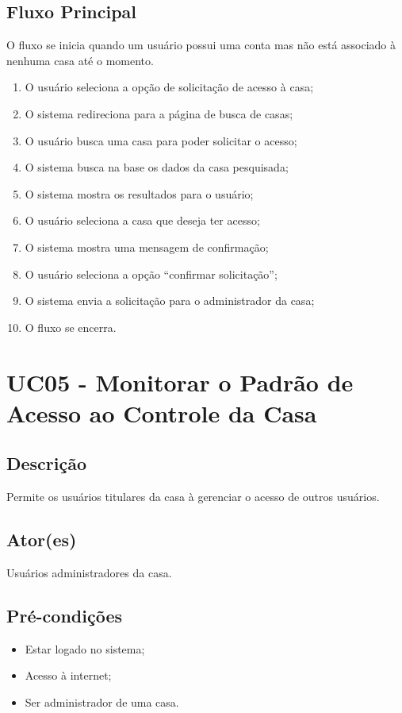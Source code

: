     \subsection{Fluxo Principal}
        O fluxo se inicia quando um usuário possui uma conta mas não está associado à nenhuma casa até o momento.
        \begin{enumerate}
            \item O usuário seleciona a opção de solicitação de acesso à casa;
            \item O sistema redireciona para a página de busca de casas;
            \item O usuário busca uma casa para poder solicitar o acesso;
            \item O sistema busca na base os dados da casa pesquisada;
            \item O sistema mostra os resultados para o usuário;
            \item O usuário seleciona a casa que deseja ter acesso;
            \item O sistema mostra uma mensagem de confirmação;
            \item O usuário seleciona a opção “confirmar solicitação”;
            \item O sistema envia a solicitação para o administrador da casa;
            \item O fluxo se encerra.
        \end{enumerate}

\section{UC05 \-- Monitorar o Padrão de Acesso ao Controle da Casa}
    \subsection{Descrição}
        Permite os usuários titulares da casa à gerenciar o acesso de outros usuários.
    \subsection{Ator(es)}
        Usuários administradores da casa.
    \subsection{Pré-condições}
        \begin{itemize}
            \item Estar logado no sistema;
            \item Acesso à internet;
            \item Ser administrador de uma casa.
        \end{itemize}
